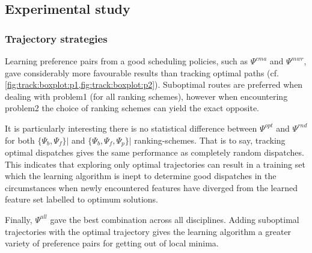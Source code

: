 \subsection{Experimental study}\label{sec:sec:trdat:param:expr}

\begin{comment}
Combining the ranking schemes, $\Psi_a$, improves the individual 
ranking-schemes across all disciplines, except in the case of 


Moreover, it is noted that the learning algorithm is able to significantly 
outperform the original heuristics, MWR and CMA-ES (white), used to create the 
training data $\Psi^{mwr}$ (grey) and $\Psi^{cma}$ (yellow), respectively (cf. 
\cref{fig:track:boxplot:p1,fig:track:boxplot:p2}). For both \Problem{1} and 
\Problem{2}, linear ordinal regression models based on $\Psi^{mwr}$ are 
significantly better than $MWR$, irrespective of the ranking schemes. Whereas 
the fixed weights found via CMA-ES are only outperformed by linear ordinal 
regression models based on $\{\Psi_b^{cma},\Psi_a^{cma}\}$. This implies that 
ranking scheme needs to be selected appropriately. Result hold for the test 
data.
\end{comment}

\subsubsection{Trajectory strategies}
Learning preference pairs from a good scheduling policies, such as $\Psi^{cma}$ 
and $\Psi^{mwr}$, gave considerably more favourable results than tracking 
optimal paths (cf. \cref{fig:track:boxplot:p1,fig:track:boxplot:p2}). 
Suboptimal routes are preferred when dealing with problem{1} (for all ranking 
schemes), however when encountering problem{2} the choice of ranking schemes 
can yield the exact opposite.

It is particularly interesting there is no statistical difference between 
$\Psi^{opt}$ and $\Psi^{rnd}$ for both $\{\Psi_{b},\Psi_{f}\}\big|$ 
and 
$\{\Psi_b,\Psi_f,\Psi_p\}\big|$ ranking-schemes. That is to say, 
tracking 
optimal dispatches gives the same performance as completely random dispatches. 
This indicates that exploring only optimal trajectories can result in a 
training set which the learning algorithm is inept to determine good dispatches 
in the circumstances when newly encountered features have diverged from the 
learned feature set labelled to optimum solutions. 

Finally, $\Psi^{all}$ gave the best combination across all disciplines. Adding 
suboptimal trajectories with the optimal trajectory gives the learning 
algorithm a greater variety of preference pairs for getting out of local minima.

